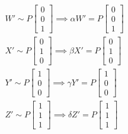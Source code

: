 \documentclass[12pt, oneside]{article}
\begin{document}
\begin{align*}
  W' \sim P
   \begin{bmatrix}
  0 		\\
  0 		\\
  1		
  \end{bmatrix} \implies 
  \alpha W' = P
   \begin{bmatrix}
  0 		\\
  0 		\\
  1		
  \end{bmatrix}   \\
  X' \sim P
   \begin{bmatrix}
  0 		\\
  1 		\\
  0		
  \end{bmatrix} \implies 
  \beta X' = P
   \begin{bmatrix}
  0 		\\
  1 		\\
  0		
  \end{bmatrix}  \\
  Y' \sim P
   \begin{bmatrix}
  1 		\\
  0 		\\
  0		
  \end{bmatrix} \implies 
  \gamma Y' = P
   \begin{bmatrix}
  1 		\\
  0 		\\
  0		
  \end{bmatrix}   \\
  Z' \sim P
   \begin{bmatrix}
  1 		\\
  1 		\\
  1		
  \end{bmatrix} \implies 
  \delta Z' = P
   \begin{bmatrix}
  1 		\\
  1 		\\
  1		
  \end{bmatrix} 
  \end{align*}
  
\end{document}
